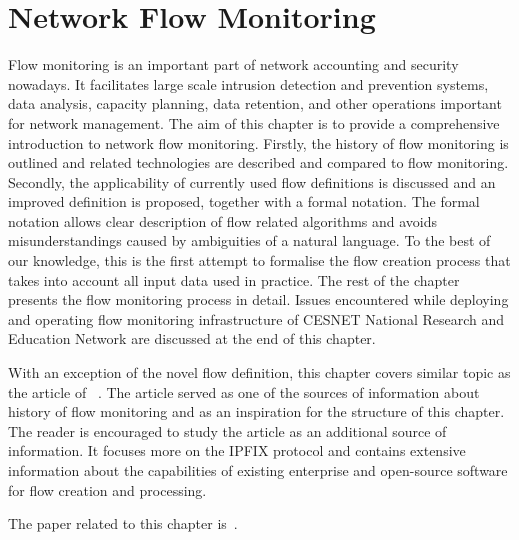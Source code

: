 \chapter{Network Flow Monitoring}\label{chap:network-flow-monitoring}

\begin{chapintro}

Flow monitoring is an important part of network accounting and security nowadays. It facilitates large scale intrusion detection and prevention systems, data analysis, capacity planning, data retention, and other operations important for network management. The aim of this chapter is to provide a comprehensive introduction to network flow monitoring. Firstly, the history of flow monitoring is outlined and related technologies are described and compared to flow monitoring. Secondly, the applicability of currently used flow definitions is discussed and an improved definition is proposed, together with a formal notation. The formal notation allows clear description of flow related algorithms and avoids misunderstandings caused by ambiguities of a natural language. To the best of our knowledge, this is the first attempt to formalise the flow creation process that takes into account all input data used in practice. The rest of the chapter presents the flow monitoring process in detail. Issues encountered while deploying and operating flow monitoring infrastructure of CESNET National Research and Education Network are discussed at the end of this chapter. 

With an exception of the novel flow definition, this chapter covers similar topic as the article of \citeauthor{Hofstede-2014-Flow}~\cite{Hofstede-2014-Flow}. The article served as one of the sources of information about history of flow monitoring and as an inspiration for the structure of this chapter. The reader is encouraged to study the article as an additional source of information. It focuses more on the IPFIX protocol and contains extensive information about the capabilities of existing enterprise and open-source software for flow creation and processing. 

The paper related to this chapter is~\cite{Velan-2018-Improving}.


\end{chapintro}
